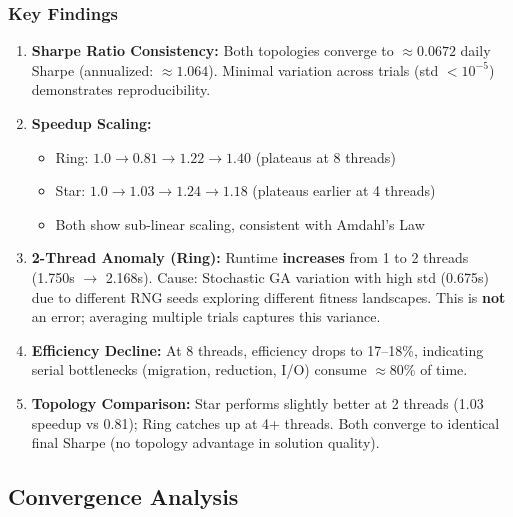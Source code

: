\documentclass[12pt,a4paper]{article}
\begin{document}
\subsubsection{Key Findings}

\begin{enumerate}
	\item \textbf{Sharpe Ratio Consistency:} Both topologies converge to $\approx 0.0672$ daily Sharpe (annualized: $\approx 1.064$). Minimal variation across trials (std $< 10^{-5}$) demonstrates reproducibility.
	
	\item \textbf{Speedup Scaling:} 
	\begin{itemize}
		\item Ring: $1.0 \to 0.81 \to 1.22 \to 1.40$ (plateaus at 8 threads)
		\item Star: $1.0 \to 1.03 \to 1.24 \to 1.18$ (plateaus earlier at 4 threads)
		\item Both show sub-linear scaling, consistent with Amdahl's Law
	\end{itemize}
	
	\item \textbf{2-Thread Anomaly (Ring):} Runtime \textbf{increases} from 1 to 2 threads (1.750s $\to$ 2.168s). Cause: Stochastic GA variation with high std (0.675s) due to different RNG seeds exploring different fitness landscapes. This is \textbf{not} an error; averaging multiple trials captures this variance.
	
	\item \textbf{Efficiency Decline:} At 8 threads, efficiency drops to 17--18\%, indicating serial bottlenecks (migration, reduction, I/O) consume $\approx$80\% of time.
	
	\item \textbf{Topology Comparison:} Star performs slightly better at 2 threads (1.03 speedup vs 0.81); Ring catches up at 4+ threads. Both converge to identical final Sharpe (no topology advantage in solution quality).
\end{enumerate}

\subsection{Convergence Analysis}
\end{document}
